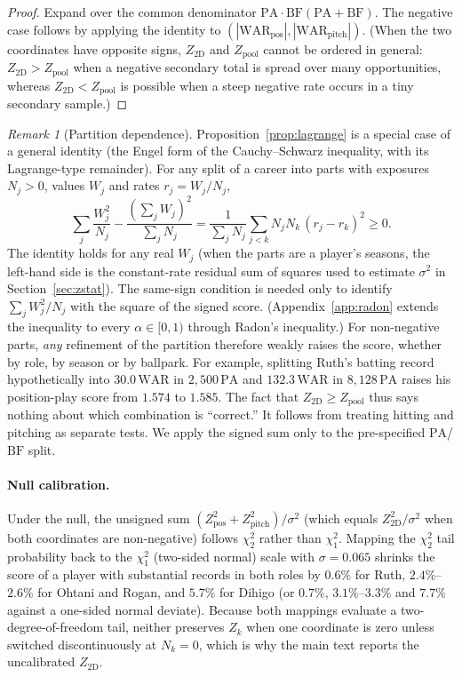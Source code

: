 \documentclass[11pt,letterpaper]{article}
\theoremstyle{plain}
\theoremstyle{definition}
\theoremstyle{remark}
\newtheorem{remark}{Remark}
\newcommand{\WAR}{\mathrm{WAR}}
\newcommand{\PA}{\mathrm{PA}}
\newcommand{\BF}{\mathrm{BF}}
\newcommand{\Zpos}{Z_{\mathrm{pos}}}
\newcommand{\Zpitch}{Z_{\mathrm{pitch}}}
\newcommand{\Zpool}{Z_{\mathrm{pool}}}
\newcommand{\Ztwoway}{Z_{\mathrm{2D}}}
\begin{document}
\begin{proof}
Expand over the common denominator $\PA\cdot\BF(\PA+\BF)$. The negative case follows by applying the identity to $(|\WAR_{\mathrm{pos}}|, |\WAR_{\mathrm{pitch}}|)$. (When the two coordinates have opposite signs, $\Ztwoway$ and $\Zpool$ cannot be ordered in general: $\Ztwoway > \Zpool$ when a negative secondary total is spread over many opportunities, whereas $\Ztwoway < \Zpool$ is possible when a steep negative rate occurs in a tiny secondary sample.)
\end{proof}

\begin{remark}[Partition dependence]
\label{rem:partition}
Proposition~\ref{prop:lagrange} is a special case of a general identity (the Engel form of the Cauchy--Schwarz inequality, with its Lagrange-type remainder). For any split of a career into parts with exposures $N_j > 0$, values $W_j$ and rates $r_j = W_j/N_j$,
\begin{equation}
    \sum_j \frac{W_j^2}{N_j} - \frac{(\sum_j W_j)^2}{\sum_j N_j} = \frac{1}{\sum_j N_j}\sum_{j<k} N_j N_k\,(r_j - r_k)^2 \ge 0 .
\end{equation}
The identity holds for any real $W_j$ (when the parts are a player's seasons, the left-hand side is the constant-rate residual sum of squares used to estimate $\sigma^2$ in Section~\ref{sec:zstat}). The same-sign condition is needed only to identify $\sum_j W_j^2/N_j$ with the square of the signed score. (Appendix~\ref{app:radon} extends the inequality to every $\alpha \in [0,1)$ through Radon's inequality.) For non-negative parts, \emph{any} refinement of the partition therefore weakly raises the score, whether by role, by season or by ballpark. For example, splitting Ruth's batting record hypothetically into $30.0\,\WAR$ in $2{,}500\,\PA$ and $132.3\,\WAR$ in $8{,}128\,\PA$ raises his position-play score from $1.574$ to $1.585$. The fact that $\Ztwoway \ge \Zpool$ thus says nothing about which combination is ``correct.'' It follows from treating hitting and pitching as separate tests. We apply the signed sum only to the pre-specified $\PA$/$\BF$ split.
\end{remark}

\paragraph{Null calibration.} Under the null, the unsigned sum $(\Zpos^2 + \Zpitch^2)/\sigma^2$ (which equals $\Ztwoway^2/\sigma^2$ when both coordinates are non-negative) follows $\chi^2_2$ rather than $\chi^2_1$. Mapping the $\chi^2_2$ tail probability back to the $\chi^2_1$ (two-sided normal) scale with $\sigma = 0.065$ shrinks the score of a player with substantial records in both roles by $0.6\%$ for Ruth, $2.4\%$--$2.6\%$ for Ohtani and Rogan, and $5.7\%$ for Dihigo (or $0.7\%$, $3.1\%$--$3.3\%$ and $7.7\%$ against a one-sided normal deviate). Because both mappings evaluate a two-degree-of-freedom tail, neither preserves $Z_k$ when one coordinate is zero unless switched discontinuously at $N_k = 0$, which is why the main text reports the uncalibrated $\Ztwoway$.
\end{document}
